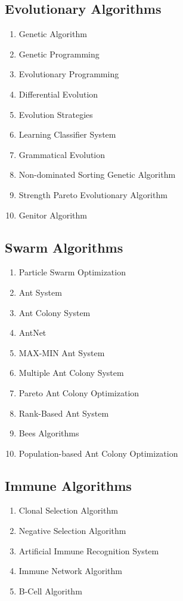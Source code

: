 \documentclass[a4paper, 11pt]{article}
\begin{document}
\subsection{Evolutionary Algorithms}
\begin{enumerate}
	\item Genetic Algorithm
	\item Genetic Programming
	\item Evolutionary Programming
	\item Differential Evolution
	\item Evolution Strategies
	\item Learning Classifier System
	\item Grammatical Evolution
	\item Non-dominated Sorting Genetic Algorithm
	\item Strength Pareto Evolutionary Algorithm
	\item Genitor Algorithm
\end{enumerate}

\subsection{Swarm Algorithms}
\begin{enumerate}
	\item Particle Swarm Optimization
	\item Ant System
	\item Ant Colony System
	\item AntNet
	\item MAX-MIN Ant System
	\item Multiple Ant Colony System
	\item Pareto Ant Colony Optimization
	\item Rank-Based Ant System
	\item Bees Algorithms
	\item Population-based Ant Colony Optimization
\end{enumerate}

\subsection{Immune Algorithms}
\begin{enumerate}
	\item Clonal Selection Algorithm
	\item Negative Selection Algorithm
	\item Artificial Immune Recognition System
	\item Immune Network Algorithm
	\item B-Cell Algorithm
\end{enumerate}
\end{document}
